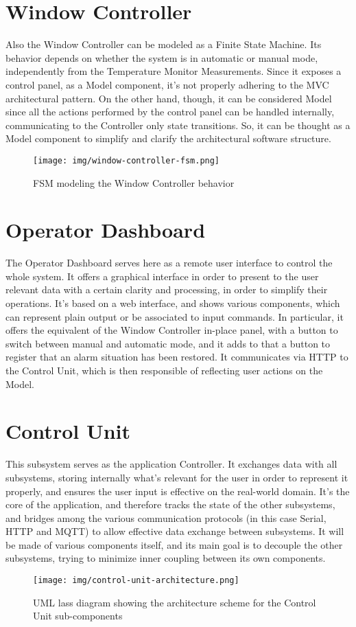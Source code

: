 \documentclass[a4paper,12pt]{report}
\begin{document}
	\section{Window Controller}
	Also the Window Controller can be modeled as a Finite State Machine. Its behavior depends on whether the system is in automatic or manual mode, independently from the Temperature Monitor Measurements. Since it exposes a control panel, as a Model component, it's not properly adhering to the MVC architectural pattern. On the other hand, though, it can be considered Model since all the actions performed by the control panel can be handled internally, communicating to the Controller only state transitions. So, it can be thought as a Model component to simplify and clarify the architectural software structure.
	\begin{figure}[H]
		\centering{}
		\texttt{[image: img/window-controller-fsm.png]}
		\caption{FSM modeling the Window Controller behavior}
		\label{img:window-controller-fsm}
	\end{figure}
	\section{Operator Dashboard}
	The Operator Dashboard serves here as a remote user interface to control the whole system. It offers a graphical interface in order to present to the user relevant data with a certain clarity and processing, in order to simplify their operations. It's based on a web interface, and shows various components, which can represent plain output or be associated to input commands. In particular, it offers the equivalent of the Window Controller in-place panel, with a button to switch between manual and automatic mode, and it adds to that a button to register that an alarm situation has been restored. It communicates via HTTP to the Control Unit, which is then responsible of reflecting user actions on the Model.
	\section{Control Unit}
	This subsystem serves as the application Controller. It exchanges data with all subsystems, storing internally what's relevant for the user in order to represent it properly, and ensures the user input is effective on the real-world domain. It's the core of the application, and therefore tracks the state of the other subsystems, and bridges among the various communication protocols (in this case Serial, HTTP and MQTT) to allow effective data exchange between subsystems. It will be made of various components itself, and its main goal is to decouple the other subsystems, trying to minimize inner coupling between its own components.
	\begin{figure}[H]
		\centering{}
		\texttt{[image: img/control-unit-architecture.png]}
		\caption{UML lass diagram showing the architecture scheme for the Control Unit sub-components}
		\label{img:control-unit-architecture}
	\end{figure}
	
\end{document}
